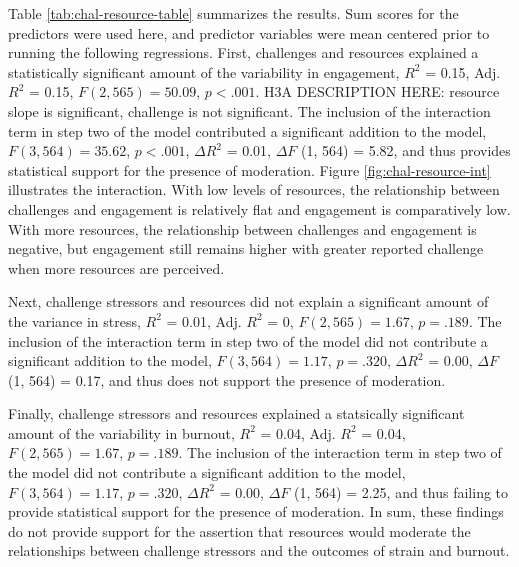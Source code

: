 \documentclass[
  man,mask]{apa7}
\begin{document}
Table \ref{tab:chal-resource-table} summarizes the results. Sum scores for the predictors were used here, and predictor variables were mean centered prior to running the following regressions. First, challenges and resources explained a statistically significant amount of the variability in engagement, \(R^2\) = 0.15, Adj. \(R^2\) = 0.15, \(F(2, 565) = 50.09\), \(p < .001\). H3A DESCRIPTION HERE: resource slope is significant, challenge is not significant. The inclusion of the interaction term in step two of the model contributed a significant addition to the model, \(F(3, 564) = 35.62\), \(p < .001\), \(\Delta R^2\) = 0.01, \(\Delta F\) (1, 564) = 5.82, and thus provides statistical support for the presence of moderation. Figure \ref{fig:chal-resource-int} illustrates the interaction. With low levels of resources, the relationship between challenges and engagement is relatively flat and engagement is comparatively low. With more resources, the relationship between challenges and engagement is negative, but engagement still remains higher with greater reported challenge when more resources are perceived.

Next, challenge stressors and resources did not explain a significant amount of the variance in stress, \(R^2\) = 0.01, Adj. \(R^2\) = 0, \(F(2, 565) = 1.67\), \(p = .189\). The inclusion of the interaction term in step two of the model did not contribute a significant addition to the model, \(F(3, 564) = 1.17\), \(p = .320\), \(\Delta R^2\) = 0.00, \(\Delta F\) (1, 564) = 0.17, and thus does not support the presence of moderation.

Finally, challenge stressors and resources explained a statsically significant amount of the variability in burnout, \(R^2\) = 0.04, Adj. \(R^2\) = 0.04, \(F(2, 565) = 1.67\), \(p = .189\). The inclusion of the interaction term in step two of the model did not contribute a significant addition to the model, \(F(3, 564) = 1.17\), \(p = .320\), \(\Delta R^2\) = 0.00, \(\Delta F\) (1, 564) = 2.25, and thus failing to provide statistical support for the presence of moderation. In sum, these findings do not provide support for the assertion that resources would moderate the relationships between challenge stressors and the outcomes of strain and burnout.
\end{document}
